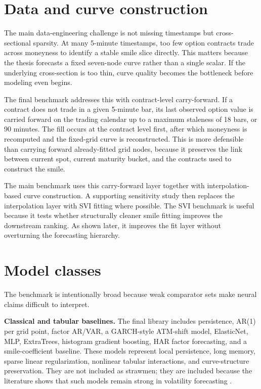 \documentclass[12pt]{report}
\begin{document}
\section{Data and curve construction}
The main data-engineering challenge is not missing timestamps but cross-sectional sparsity. At many 5-minute timestamps, too few option contracts trade across moneyness to identify a stable smile slice directly. This matters because the thesis forecasts a fixed seven-node curve rather than a single scalar. If the underlying cross-section is too thin, curve quality becomes the bottleneck before modeling even begins.

The final benchmark addresses this with contract-level carry-forward. If a contract does not trade in a given 5-minute bar, its last observed option value is carried forward on the trading calendar up to a maximum staleness of 18 bars, or 90 minutes. The fill occurs at the contract level first, after which moneyness is recomputed and the fixed-grid curve is reconstructed. This is more defensible than carrying forward already-fitted grid nodes, because it preserves the link between current spot, current maturity bucket, and the contracts used to construct the smile.

The main benchmark uses this carry-forward layer together with interpolation-based curve construction. A supporting sensitivity study then replaces the interpolation layer with SVI fitting where possible. The SVI benchmark is useful because it tests whether structurally cleaner smile fitting improves the downstream ranking. As shown later, it improves the fit layer without overturning the forecasting hierarchy.

\section{Model classes}
The benchmark is intentionally broad because weak comparator sets make neural claims difficult to interpret.

\textbf{Classical and tabular baselines.} The final library includes persistence, AR(1) per grid point, factor AR/VAR, a GARCH-style ATM-shift model, ElasticNet, MLP, ExtraTrees, histogram gradient boosting, HAR factor forecasting, and a smile-coefficient baseline. These models represent local persistence, long memory, sparse linear regularization, nonlinear tabular interactions, and curve-structure preservation. They are not included as strawmen; they are included because the literature shows that such models remain strong in volatility forecasting \citep{engle1982,bollerslev1986,corsi2009,chen2024bspline}.
\end{document}
